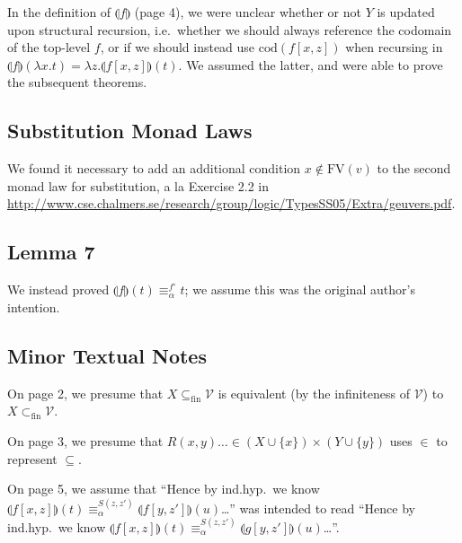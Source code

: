 \documentclass{article}
\begin{document}
In the definition of $\llparenthesis f \rrparenthesis$ (page 4), we were unclear whether or not $Y$
is updated upon structural recursion, i.e.\ whether we should always reference the codomain of the
top-level $f$, or if we should instead use $\textrm{cod}(f[x,z])$ when recursing in $\llparenthesis
f \rrparenthesis(\lambda x. t) = \lambda z. \llparenthesis f[x,z] \rrparenthesis (t)$. We assumed
the latter, and were able to prove the subsequent theorems.

\subsection{Substitution Monad Laws}

We found it necessary to add an additional condition $x \notin \textrm{FV}(v)$ to the second
monad law for substitution, a la Exercise 2.2 in
\url{http://www.cse.chalmers.se/research/group/logic/TypesSS05/Extra/geuvers.pdf}.

\subsection{Lemma 7}

We instead proved $\llparenthesis f \rrparenthesis (t) \equiv_\alpha^{f^\circ} t$; we assume this
was the original author's intention.

\subsection{Minor Textual Notes}

On page 2, we presume that $X \subseteq_{\textrm{fin}} \mathcal{V}$ is equivalent (by the infiniteness of
$\mathcal{V}$) to $X \subset_{\textrm{fin}} \mathcal{V}$.

On page 3, we presume that $R(x,y) \dots \in (X \cup \{ x \}) \times (Y \cup \{ y \})$ uses $\in$ to
represent $\subseteq$.

On page 5, we assume that ``Hence by ind.hyp.\ we know $\llparenthesis f[x,z] \rrparenthesis (t) \equiv_\alpha^{S(z,z')}
\llparenthesis f[y,z'] \rrparenthesis (u)$\dots'' was intended to read ``Hence by ind.hyp.\ we know $\llparenthesis f[x,z] \rrparenthesis (t) \equiv_\alpha^{S(z,z')}
\llparenthesis g[y,z'] \rrparenthesis (u)$\dots''.
\end{document}
